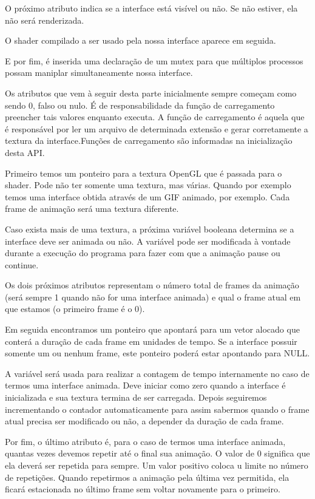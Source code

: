 O próximo atributo indica se a interface está visível ou não. Se não
estiver, ela não será renderizada.

O shader compilado a ser usado pela nossa interface aparece em
seguida.

E por fim, é inserida uma declaração de um mutex para que múltiplos
processos possam maniplar simultaneamente nossa interface.

Os atributos que vem à seguir desta parte inicialmente sempre começam
como sendo 0, falso ou nulo. É de responsabilidade da função de
carregamento preencher tais valores enquanto executa. A função de
carregamento é aquela que é responsável por ler um arquivo de
determinada extensão e gerar corretamente a textura da
interface.Funções de carregamento são informadas na inicialização
desta API.

Primeiro temos um ponteiro para a textura OpenGL que é passada para o
shader. Pode não ter somente uma textura, mas várias. Quando por
exemplo temos uma interface obtida através de um GIF animado, por
exemplo. Cada frame de animação será uma textura diferente.

Caso exista mais de uma textura, a próxima variável booleana determina
se a interface deve ser animada ou não. A variável pode ser modificada
à vontade durante a execução do programa para fazer com que a animação
pause ou continue.

Os dois próximos atributos representam o número total de frames da
animação (será sempre 1 quando não for uma interface animada) e qual o
frame atual em que estamos (o primeiro frame é o 0).

Em seguida encontramos um ponteiro que apontará para um vetor alocado
que conterá a duração de cada frame em unidades de tempo. Se a
interface possuir somente um ou nenhum frame, este ponteiro poderá
estar apontando para NULL.

A variável  será usada para realizar a contagem de
tempo internamente no caso de termos uma interface animada. Deve
iniciar como zero quando a interface é inicializada e sua textura
termina de ser carregada. Depois seguiremos incrementando o contador
automaticamente para assim sabermos quando o frame atual precisa ser
modificado ou não, a depender da duração de cada frame.

Por fim, o último atributo é, para o caso de termos uma interface
animada, quantas vezes devemos repetir até o final sua animação. O
valor de 0 significa que ela deverá ser repetida para sempre. Um valor
positivo coloca u limite no número de repetições. Quando repetirmos a
animação pela última vez permitida, ela ficará estacionada no último
frame sem voltar novamente para o primeiro.

